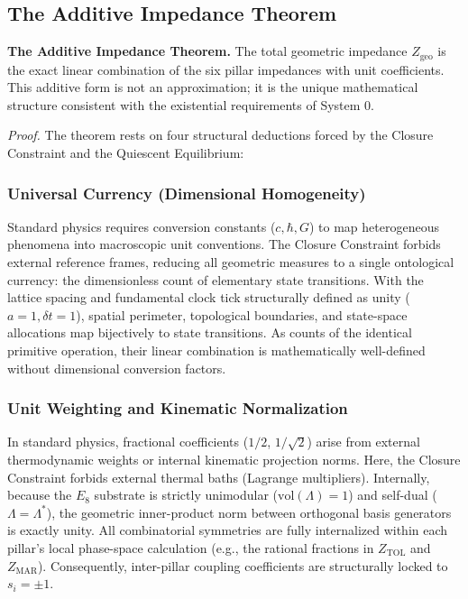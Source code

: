 \subsection{The Additive Impedance Theorem}
\label{subsec:additive_theorem}

\noindent\textbf{The Additive Impedance Theorem.} 
The total geometric impedance $Z_{\mathrm{geo}}$ is the exact linear combination of the six pillar impedances with unit coefficients. This additive form is not an approximation; it is the unique mathematical structure consistent with the existential requirements of System 0.

\vspace{0.5em}
\noindent\textit{Proof.} The theorem rests on four structural deductions forced by the Closure Constraint and the Quiescent Equilibrium:

\subsubsection{Universal Currency (Dimensional Homogeneity)}
Standard physics requires conversion constants ($c, \hbar, G$) to map heterogeneous phenomena into macroscopic unit conventions. The Closure Constraint forbids external reference frames, reducing all geometric measures to a single ontological currency: the dimensionless count of elementary state transitions. With the lattice spacing and fundamental clock tick structurally defined as unity ($a=1, \delta t=1$), spatial perimeter, topological boundaries, and state-space allocations map bijectively to state transitions. As counts of the identical primitive operation, their linear combination is mathematically well-defined without dimensional conversion factors.

\subsubsection{Unit Weighting and Kinematic Normalization}
In standard physics, fractional coefficients ($1/2$, $1/\sqrt{2}$) arise from external thermodynamic weights or internal kinematic projection norms. Here, the Closure Constraint forbids external thermal baths (Lagrange multipliers). Internally, because the $E_8$ substrate is strictly unimodular ($\text{vol}(\Lambda)=1$) and self-dual ($\Lambda = \Lambda^*$), the geometric inner-product norm between orthogonal basis generators is exactly unity. All combinatorial symmetries are fully internalized within each pillar's local phase-space calculation (e.g., the rational fractions in $Z_{\mathrm{TOL}}$ and $Z_{\mathrm{MAR}}$). Consequently, inter-pillar coupling coefficients are structurally locked to $s_i = \pm 1$.


